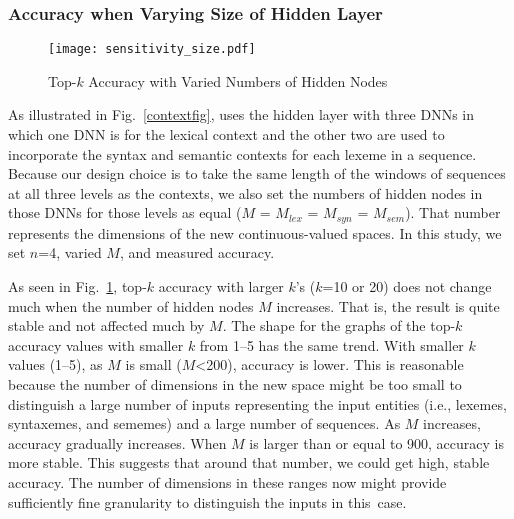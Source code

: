 \subsubsection{Accuracy when Varying Size of Hidden Layer}

\begin{figure}[t]
\centering
\texttt{[image: sensitivity\_size.pdf]}
\caption{Top-$k$ Accuracy with Varied Numbers of Hidden Nodes}
\label{sensitive}
\end{figure}

As illustrated in Fig.~\ref{contextfig}, {\tool} uses the hidden
layer with three DNNs in which one DNN is for the lexical context and
the other two are used to incorporate the syntax and semantic contexts
for each lexeme in a sequence. Because our design choice is to take
the same length 
of the windows of sequences at all three levels as the contexts, we
also set the numbers of hidden nodes in those DNNs for those levels as
equal ($M$ = $M_{lex}$ = $M_{syn}$ = $M_{sem}$). That number
represents the dimensions of the new continuous-valued spaces.
In this study, we set $n$=4, varied $M$, and measured accuracy.



As seen in Fig.~\ref{sensitive}, top-$k$ accuracy
with larger $k$'s ($k$=10 or 20) does not change much when the number of
hidden nodes $M$ increases. That is, the result is quite stable and
not affected much by $M$. The shape for the graphs of the top-$k$
accuracy values with smaller $k$ from 1--5 has the same trend.
With smaller $k$ values (1--5), as $M$ is small ($M$<200), accuracy is
lower. This is reasonable because the number of dimensions in the new
space might be too small to distinguish a large number of inputs
representing the input entities (i.e., lexemes, syntaxemes, and
sememes) and a large number of sequences.
%
As $M$ increases, accuracy gradually increases. When $M$ is larger
than or equal to 900, accuracy is more stable. This suggests that
around that number, we could get high, stable accuracy. The number of
dimensions in these ranges now might provide sufficiently fine
granularity to distinguish the inputs in this~case.






